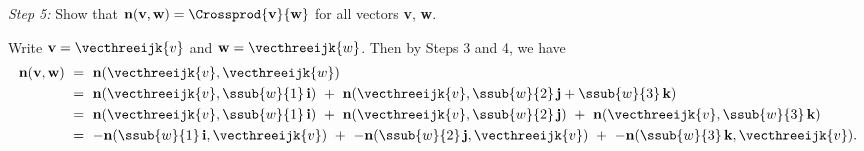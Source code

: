 \par\noindent \emph{Step 5:} Show that $\textbf{n}(\textbf{v},\textbf{w}) = \Crossprod{\textbf{v}}{\textbf{w}}$ for all
vectors \textbf{v}, \textbf{w}.\vspace{1mm}
\par\noindent Write $\textbf{v} = \vecthreeijk{v}$ and $\textbf{w} = \vecthreeijk{w}$. Then by Steps 3 and 4, we have
\newpage
\begin{align*}
 \textbf{n}(\textbf{v},\textbf{w}) ~&=~ \textbf{n}(\vecthreeijk{v},\vecthreeijk{w})\\
 &=~ \textbf{n}(\vecthreeijk{v},\ssub{w}{1}\,\textbf{i}) ~+~ \textbf{n}(\vecthreeijk{v},\ssub{w}{2}\,\textbf{j} +
  \ssub{w}{3}\,\textbf{k})\\
 &=~ \textbf{n}(\vecthreeijk{v},\ssub{w}{1}\,\textbf{i}) ~+~ \textbf{n}(\vecthreeijk{v},\ssub{w}{2}\,\textbf{j}) ~+~
  \textbf{n}(\vecthreeijk{v},\ssub{w}{3}\,\textbf{k})\\
 &=~ -\textbf{n}(\ssub{w}{1}\,\textbf{i},\vecthreeijk{v}) ~+~ -\textbf{n}(\ssub{w}{2}\,\textbf{j},\vecthreeijk{v}) ~+~
  -\textbf{n}(\ssub{w}{3}\,\textbf{k},\vecthreeijk{v}) .
\end{align*}

